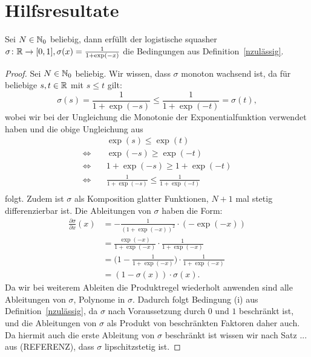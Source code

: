 \section{Hilfsresultate}
\begin{lem}
\label{lem:logsquasher}
Sei $N \in \mathbb{N}_0$ beliebig, dann erfüllt der logistische squasher $\sigma\colon \mathbb{R} \to [0, 1], \sigma(x) = \frac{1}{1 + \exp(-x)}$ die Bedingungen aus Definition~\ref{nzulässig}.  
\end{lem}
\begin{proof}
Sei $N \in \mathbb{N}_0$ beliebig. Wir wissen, dass $\sigma$ monoton wachsend ist, da für beliebige $s, t \in \mathbb{R}$ mit $s \leq t$ gilt:
$$\sigma(s) = \frac{1}{1 + \exp(-s)} \leq \frac{1}{1 + \exp(-t)} = \sigma(t),$$
wobei wir bei der Ungleichung die Monotonie der Exponentialfunktion verwendet haben und die obige Ungleichung aus
\begin{equation*}
\begin{split}
& \quad \exp(s) \leq \exp(t) \\
 \Leftrightarrow & \quad \exp(-s) \geq \exp(-t) \\
 \Leftrightarrow & \quad 1 + \exp(-s) \geq 1 + \exp(-t) \\
 \Leftrightarrow & \quad \frac{1}{1 + \exp(-s)} \leq \frac{1}{1 + \exp(-t)} \\
\end{split}
\end{equation*}
folgt. Zudem ist $\sigma$ als Komposition glatter Funktionen, $N + 1$ mal stetig differenzierbar ist. Die Ableitungen von $\sigma$ haben die Form:
\begin{equation*}
\begin{split}
\frac{\partial \sigma}{\partial x}(x) &= -\frac{1}{(1 + \exp(-x))^2} \cdot (-\exp(-x)) \\
& = \frac{\exp(-x)}{1 + \exp(-x)} \cdot \frac{1}{1 + \exp(-x)} \\
& = \bigg(1 - \frac{1}{1 + \exp(-x)}\bigg) \cdot \frac{1}{1 + \exp(-x)} \\
& = (1 - \sigma(x)) \cdot \sigma(x).
\end{split}
\end{equation*}
Da wir bei weiterem Ableiten die Produktregel wiederholt anwenden sind alle Ableitungen von $\sigma$, Polynome in $\sigma$. Dadurch folgt Bedingung (i) aus Definition~\ref{nzulässig}, da $\sigma$ nach Voraussetzung durch $0$ und $1$ beschränkt ist, und die Ableitungen von $\sigma$ als Produkt von beschränkten Faktoren daher auch. Da hiermit auch die erste Ableitung von $\sigma$ beschränkt ist wissen wir nach Satz ... aus (REFERENZ), dass $\sigma$ lipschitzstetig ist.


\end{proof}
